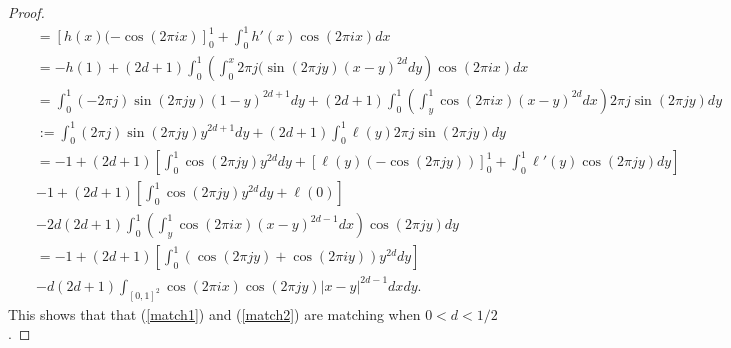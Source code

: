\documentclass[12pt]{article}
\begin{document}
\begin{proof}
\begin{eqnarray*}
&&=
\left[h(x)(-\cos(2\pi ix)\right]_0^1+\int_0^1h'(x)\cos(2\pi ix)dx\\
&&=-h(1)+(2d+1)\int_0^1\left(\int_0^x2\pi j(\sin(2\pi jy)(x-y)^{2d}dy\right)\cos(2\pi ix)dx\\
&&=\int_0^1(-2\pi j)\sin(2\pi jy)(1-y)^{2d+1}dy+(2d+1)\int_0^1\left(\int_y^1\cos(2\pi ix)(x-y)^{2d}dx\right)2\pi j\sin(2\pi jy)dy\\
&&:=
\int_0^1(2\pi j)\sin(2\pi jy)y^{2d+1}dy+(2d+1)\int_0^1\ell(y)2\pi j\sin(2\pi jy)dy\\
&&=-1+(2d+1)\left[\int_0^1\cos(2\pi jy)y^{2d}dy+\left[\ell(y)(-\cos(2\pi jy))\right]_0^1+\int_0^1\ell'(y)\cos(2\pi jy)dy\right]\\
&&
-1+(2d+1)\left[\int_0^1\cos(2\pi jy)y^{2d}dy+\ell(0)\right]\\
&&-2d(2d+1)\int_0^1\left(\int_y^1\cos(2\pi ix)(x-y)^{2d-1}dx\right)\cos(2\pi jy)dy\\
&&=-1+
(2d+1)\left[\int_0^1(\cos(2\pi jy)+\cos(2\pi iy))y^{2d}dy\right]\\
&&
-d(2d+1)\int_{[0,1]^2}\cos(2\pi ix)\cos(2\pi jy)\vert x-y\vert^{2d-1}dxdy.
\end{eqnarray*}
This shows that that (\ref{match1}) and (\ref{match2}) are matching when $0<d<1/2$.
\fi


\end{proof}
\end{document}
